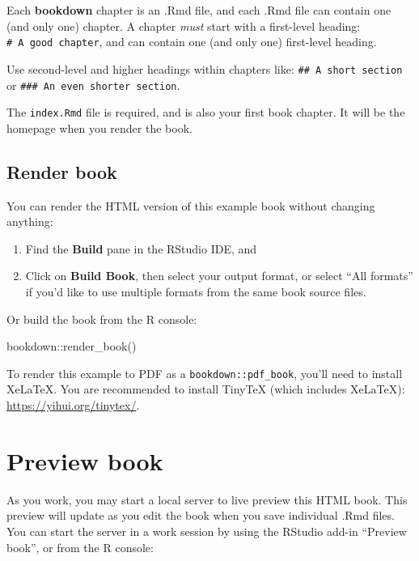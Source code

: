 \documentclass[
  11pt,
  a4paper,
  twoside]{scrbook}
\newenvironment{Shaded}{\begin{snugshade}}{\end{snugshade}}
\newcommand{\FunctionTok}[1]{\textcolor[rgb]{0.00,0.00,0.00}{#1}}
\newcommand{\NormalTok}[1]{#1}
\newcommand{\SpecialCharTok}[1]{\textcolor[rgb]{0.00,0.00,0.00}{#1}}
\begin{document}
Each \textbf{bookdown} chapter is an .Rmd file, and each .Rmd file can contain one (and only one) chapter. A chapter \emph{must} start with a first-level heading: \texttt{\#\ A\ good\ chapter}, and can contain one (and only one) first-level heading.

Use second-level and higher headings within chapters like: \texttt{\#\#\ A\ short\ section} or \texttt{\#\#\#\ An\ even\ shorter\ section}.

The \texttt{index.Rmd} file is required, and is also your first book chapter. It will be the homepage when you render the book.

\hypertarget{render-book}{%
\subsection{Render book}\label{render-book}}

You can render the HTML version of this example book without changing anything:

\begin{enumerate}
\def\labelenumi{\arabic{enumi}.}
\item
  Find the \textbf{Build} pane in the RStudio IDE, and
\item
  Click on \textbf{Build Book}, then select your output format, or select ``All formats'' if you'd like to use multiple formats from the same book source files.
\end{enumerate}

Or build the book from the R console:

\linespread{1}

\begin{Shaded}
\begin{Highlighting}[]
\NormalTok{bookdown}\SpecialCharTok{::}\FunctionTok{render\_book}\NormalTok{()}
\end{Highlighting}
\end{Shaded}

\linespread{1}

To render this example to PDF as a \texttt{bookdown::pdf\_book}, you'll need to install XeLaTeX. You are recommended to install TinyTeX (which includes XeLaTeX): \url{https://yihui.org/tinytex/}.

\hypertarget{preview-book}{%
\section{Preview book}\label{preview-book}}

As you work, you may start a local server to live preview this HTML book. This preview will update as you edit the book when you save individual .Rmd files. You can start the server in a work session by using the RStudio add-in ``Preview book'', or from the R console:
\end{document}
